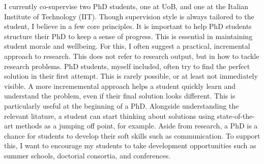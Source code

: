 \documentclass[12pt]{article}
\begin{document}
%
I currently co-supervise two PhD students, one at UoB, and one at the Italian Institute of Technology (IIT).
%
Though supervision style is always tailored to the student, I believe in a few core principles.
%
It is important to help PhD students structure their PhD to keep a sense of progress.
%
This is essential in maintaining student morale and wellbeing.
%
For this, I often suggest a practical, incremental approach to research.
%
This does not refer to research output, but in how to tackle research problems.
%
PhD students, myself included, often try to find the perfect solution in their first attempt.
%
This is rarely possible, or at least not immediately visible.
%
A more incrememental approach helps a student quickly learn and understand the problem, even if their final solution looks different.
%
This is particularly useful at the beginning of a PhD.
%
Alongside understanding the relevant litature, a student can start thinking about solutions using state-of-the-art methods as a jumping off point, for example.
%
Aside from research, a PhD is a chance for students to develop their soft skills such as communication.
%
To support this, I want to encourage my students to take development opportunities such as summer schools, doctorial consortia, and conferences.

\end{document}
